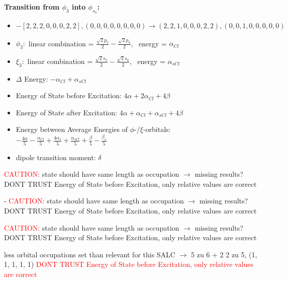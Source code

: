 \documentclass[12pt,a4paper]{article}
\begin{document}
        \noindent\textbf{Transition from $\phi_{3}$ into $\phi_{s_{3}}$:}
        \begin{itemize}
            \item $- [2, 2, 2, 0, 0, 0, 2, 2], (0, 0, 0, 0, 0, 0, 0, 0) \rightarrow (2, 2, 1, 0, 0, 0, 2, 2), (0, 0, 1, 0, 0, 0, 0, 0)$
        
            \item $\phi_{3}:$ linear combination = $\frac{\sqrt{2} p_{7}}{2} - \frac{\sqrt{2} p_{8}}{2}$, \
            energy = $\alpha_{Cl}$
            
            \item $\xi_{3}:$ linear combination = $\frac{\sqrt{2} s_{7}}{2} - \frac{\sqrt{2} s_{8}}{2}$, \
            energy = $\alpha_{s Cl}$
            
            \item $\Delta$ Energy: $- \alpha_{Cl} + \alpha_{s Cl}$
            \item Energy of State before Excitation: $4 \alpha + 2 \alpha_{Cl} + 4 \beta$
            \item Energy of State after Excitation: $4 \alpha + \alpha_{Cl} + \alpha_{s Cl} + 4 \beta$
            \item Energy between Average Energies of $\phi$-/$\xi$-orbitals: \
            $- \frac{4 \alpha}{5} - \frac{\alpha_{Cl}}{5} + \frac{4 \alpha_{s}}{5} + \frac{\alpha_{s Cl}}{5} + \frac{\beta}{5} - \frac{\beta_{s}}{5}$
        
            \item dipole transition moment: $\delta$
        
        \end{itemize}
        
	\textcolor{red}{CAUTION:} state should have same length as occupation $\rightarrow$ missing results?
	DONT TRUST \glqq{}Energy of State before Excitation\grqq{}, only relative values are correct

 - 	\textcolor{red}{CAUTION:} state should have same length as occupation $\rightarrow$ missing results?
	DONT TRUST \glqq{}Energy of State before Excitation\grqq{}, only relative values are correct

	\textcolor{red}{CAUTION:} state should have same length as occupation $\rightarrow$ missing results?
	DONT TRUST \glqq{}Energy of State before Excitation\grqq{}, only relative values are correct

less orbital occupations set than relevant for this SALC $\rightarrow$ 
5 zu 6 + 2 
2 zu 5, (1, 1, 1, 1, 1) 
\textcolor{red}{DONT TRUST \glqq{}Energy of State before Excitation\grqq{}, only relative values are correct}
\end{document}
